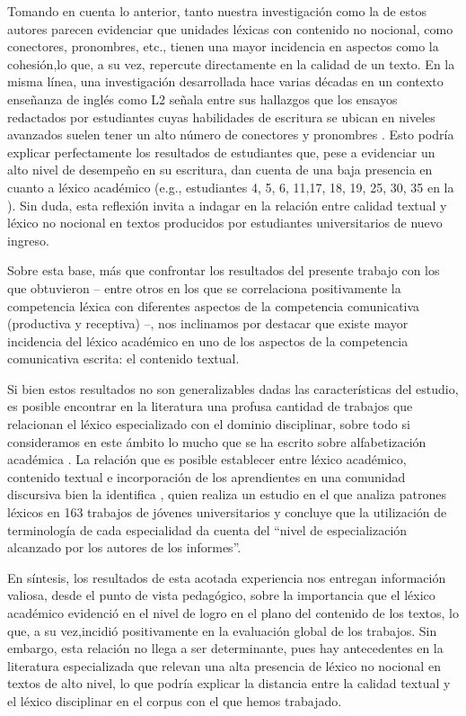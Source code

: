 \documentclass{textolivre-html}
\begin{document}
Tomando en cuenta lo anterior, tanto nuestra investigación como la de
estos autores parecen evidenciar que unidades léxicas con contenido no nocional,
como conectores, pronombres, etc., tienen una mayor incidencia en aspectos como
la cohesión,lo que, a su vez, repercute directamente en la calidad de un texto.
En la misma línea, una investigación desarrollada hace varias décadas en un
contexto enseñanza de inglés como L2 señala entre sus hallazgos que los ensayos
redactados por estudiantes cuyas habilidades de escritura se ubican en niveles
avanzados suelen tener un alto número de conectores y pronombres \cite{Reid1992}.
Esto podría explicar perfectamente los resultados de estudiantes que, pese a
evidenciar un alto nivel de desempeño en su escritura, dan cuenta de una baja
presencia en cuanto a léxico académico (e.g., estudiantes 4, 5, 6, 11,17, 18,
19, 25, 30, 35 en la ). Sin duda, esta reflexión invita a indagar en
la relación entre calidad textual y léxico no nocional en textos producidos por
estudiantes universitarios de nuevo ingreso.

Sobre esta base, más que confrontar los resultados del presente trabajo con
los que obtuvieron \textcite{RiffoOcares2014,Giammatteo2003,GonzaloZapico2016,Wood2019}
– entre otros en los que se
correlaciona positivamente la competencia léxica con diferentes aspectos de la
competencia comunicativa (productiva y receptiva) –, nos inclinamos por destacar
que existe mayor incidencia del léxico académico en uno de los aspectos de la
competencia comunicativa escrita: el contenido textual.

Si bien estos resultados no son generalizables dadas las características
del estudio, es posible encontrar en la literatura una profusa cantidad de
trabajos que relacionan el léxico especializado con el dominio disciplinar,
sobre todo si consideramos en este ámbito lo mucho que se ha escrito sobre
alfabetización académica \cite{cantis2013,Baker2019,Kse2019}.
La relación que es posible establecer entre léxico académico, contenido
textual e incorporación de los aprendientes en una comunidad discursiva bien la
identifica \textcite[p. 55]{acevedo2006}, quien realiza un estudio en el que analiza
patrones léxicos en 163 trabajos de jóvenes universitarios y concluye que la
utilización de terminología de cada especialidad da cuenta del “nivel
de especialización alcanzado por los autores de los informes”.

En síntesis, los resultados de esta acotada experiencia nos entregan
información valiosa, desde el punto de vista pedagógico, sobre la importancia
que el léxico académico evidenció en el nivel de logro en el plano del
contenido de los textos, lo que, a su vez,incidió positivamente en la
evaluación global de los trabajos. Sin embargo, esta relación no llega a ser
determinante, pues hay antecedentes en la literatura especializada que relevan
una alta presencia de léxico no nocional en textos de alto nivel, lo que
podría explicar la distancia entre la calidad textual y el léxico disciplinar en
el corpus con el que hemos trabajado.
\end{document}
